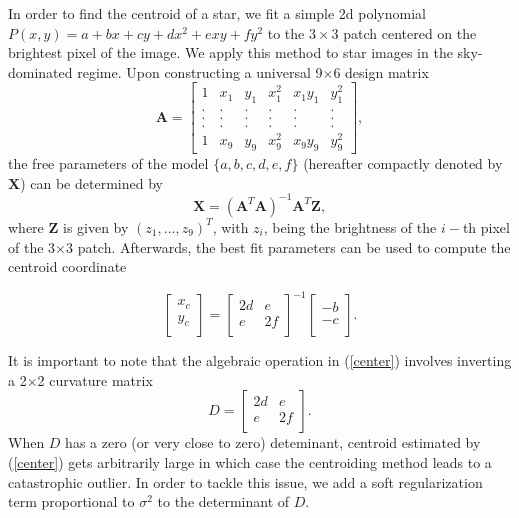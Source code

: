 \documentclass[12pt, preprint]{aastex}
\newcommand{\beq}{\begin{equation}}
\newcommand{\eeq}{\end{equation}}
\begin{document}
In order to find the centroid of a star, 
we fit a simple 2d polynomial $P(x,y)=a+bx+cy+dx^2+exy+fy^2$ to the
$3\times3$ patch centered on the brightest pixel of the
image. We apply this method to star images in the sky-dominated regime.
Upon constructing a universal 9$\times$6 design matrix
\begin{equation}
    \mathbf{A} = 
    \begin{bmatrix}
        1 & x_{1} & y_{1} & x_{1}^{2} & x_{1}y_{1} & y_{1}^{2} \\
        . & . & . & . & . & .  \\
        . & . & . & . & . & .  \\
        . & . & . & . & . & .  \\
        1 & x_{9} & y_{9} & x_{9}^{2} & x_{9}y_{9} & y_{9}^{2}
    \end{bmatrix},
\end{equation}
the free parameters of the model $\{a,b,c,d,e,f\}$
(hereafter compactly denoted by $\mathbf{X}$) can be determined by 
\beq
\mathbf{X} = (\mathbf{A}^{T}\mathbf{A})^{-1}\mathbf{A}^{T}\mathbf{Z},
\label{linearfit}
\eeq
where $\mathbf{Z}$ is given by $(z_{1},...,z_{9})^{T}$,
with $z_{i}$, being the brightness of the $i-$th pixel of the 3$\times$3 patch.
Afterwards, the best fit parameters can be used to compute the centroid coordinate

\beq
  \begin{bmatrix}
      x_{c}\\
      y_{c}\\
  \end{bmatrix} = 
  \begin{bmatrix}
      2d & e\\
      e & 2f\\
  \end{bmatrix}^{-1}
  \begin{bmatrix}
      -b\\
      -c\\
  \end{bmatrix}.
\label{center}
\eeq

It is important to note that the algebraic operation in (\ref{center}) involves 
inverting a 2$\times$2 curvature matrix
\beq
  D = 
  \begin{bmatrix}
      2d & e\\
      e & 2f\\
  \end{bmatrix}.
\eeq
When $D$ has a zero (or very close to zero) deteminant,
centroid estimated by (\ref{center}) gets arbitrarily 
large in which case the centroiding method leads to a catastrophic 
outlier. In order to tackle this issue, we add a soft regularization term
proportional to $\sigma^{2}$ to the determinant of $D$.
\end{document}
